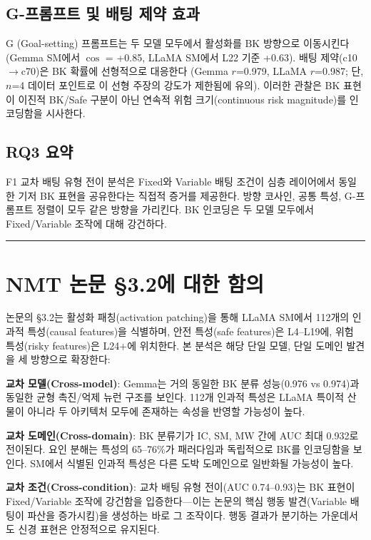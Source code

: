 \documentclass[11pt,a4paper]{article}
\begin{document}
\subsection{G-프롬프트 및 배팅 제약 효과}

G (Goal-setting) 프롬프트는 두 모델 모두에서 활성화를 BK 방향으로 이동시킨다 (Gemma SM에서 $\cos$ = +0.85, LLaMA SM에서 L22 기준 +0.63). 배팅 제약(c10$\rightarrow$c70)은 BK 확률에 선형적으로 대응한다 (Gemma $r$=0.979, LLaMA $r$=0.987; 단, $n$=4 데이터 포인트로 이 선형 주장의 강도가 제한됨에 유의). 이러한 관찰은 BK 표현이 이진적 BK/Safe 구분이 아닌 연속적 위험 크기(continuous risk magnitude)를 인코딩함을 시사한다.

\subsection{RQ3 요약}

F1 교차 배팅 유형 전이 분석은 Fixed와 Variable 배팅 조건이 심층 레이어에서 동일한 기저 BK 표현을 공유한다는 직접적 증거를 제공한다. 방향 코사인, 공통 특성, G-프롬프트 정렬이 모두 같은 방향을 가리킨다. BK 인코딩은 두 모델 모두에서 Fixed/Variable 조작에 대해 강건하다.

\bigskip\hrule\bigskip

\section{NMT 논문 \S3.2에 대한 함의}

논문의 \S3.2는 활성화 패칭(activation patching)을 통해 LLaMA SM에서 112개의 인과적 특성(causal features)을 식별하며, 안전 특성(safe features)은 L4--L19에, 위험 특성(risky features)은 L24+에 위치한다. 본 분석은 해당 단일 모델, 단일 도메인 발견을 세 방향으로 확장한다:

\textbf{교차 모델(Cross-model)}: Gemma는 거의 동일한 BK 분류 성능(0.976 vs 0.974)과 동일한 균형 촉진/억제 뉴런 구조를 보인다. 112개 인과적 특성은 LLaMA 특이적 산물이 아니라 두 아키텍처 모두에 존재하는 속성을 반영할 가능성이 높다.

\textbf{교차 도메인(Cross-domain)}: BK 분류기가 IC, SM, MW 간에 AUC 최대 0.932로 전이된다. 요인 분해는 특성의 65--76\%가 패러다임과 독립적으로 BK를 인코딩함을 보인다. SM에서 식별된 인과적 특성은 다른 도박 도메인으로 일반화될 가능성이 높다.

\textbf{교차 조건(Cross-condition)}: 교차 배팅 유형 전이(AUC 0.74--0.93)는 BK 표현이 Fixed/Variable 조작에 강건함을 입증한다---이는 논문의 핵심 행동 발견(Variable 배팅이 파산을 증가시킴)을 생성하는 바로 그 조작이다. 행동 결과가 분기하는 가운데서도 신경 표현은 안정적으로 유지된다.
\end{document}
